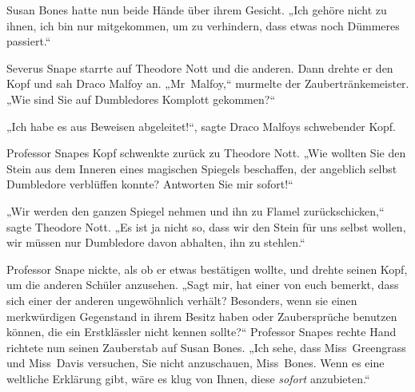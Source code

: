 Susan Bones hatte nun beide Hände über ihrem Gesicht. „Ich gehöre nicht zu ihnen, ich bin nur mitgekommen, um zu verhindern, dass etwas noch Dümmeres passiert.“

Severus Snape starrte auf Theodore Nott und die anderen. Dann drehte er den Kopf und sah Draco Malfoy an. „Mr~Malfoy,“ murmelte der Zaubertränkemeister.
„Wie sind Sie auf Dumbledores Komplott gekommen?“

„Ich habe es aus Beweisen abgeleitet!“, sagte Draco Malfoys schwebender Kopf.

Professor Snapes Kopf schwenkte zurück zu Theodore Nott.
„Wie wollten Sie den Stein aus dem Inneren eines magischen Spiegels beschaffen, der angeblich selbst Dumbledore verblüffen konnte? Antworten Sie mir sofort!“

„Wir werden den ganzen Spiegel nehmen und ihn zu Flamel zurückschicken,“ sagte Theodore Nott. „Es ist ja nicht so, dass wir den Stein für uns selbst wollen, wir müssen nur Dumbledore davon abhalten, ihn zu stehlen.“

Professor Snape nickte, als ob er etwas bestätigen wollte, und drehte seinen Kopf, um die anderen Schüler anzusehen.
„Sagt mir, hat einer von euch bemerkt, dass sich einer der anderen ungewöhnlich verhält? Besonders, wenn sie einen merkwürdigen Gegenstand in ihrem Besitz haben oder Zaubersprüche benutzen können, die ein Erstklässler nicht kennen sollte?“
Professor Snapes rechte Hand richtete nun seinen Zauberstab auf Susan Bones.
„Ich sehe, dass Miss~Greengrass und Miss~Davis versuchen, Sie nicht anzuschauen, Miss~Bones. Wenn es eine weltliche Erklärung gibt, wäre es klug von Ihnen, diese \emph{sofort} anzubieten.“

